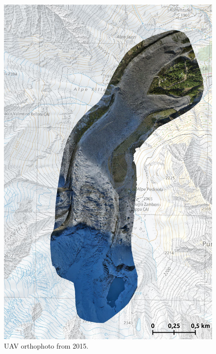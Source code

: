 \begin{figure}[p]
    \centering
    \includegraphics[height=\textheight]{figures/appendix/orto_2015.jpg}
    \caption{UAV orthophoto from 2015.}
\end{figure}

